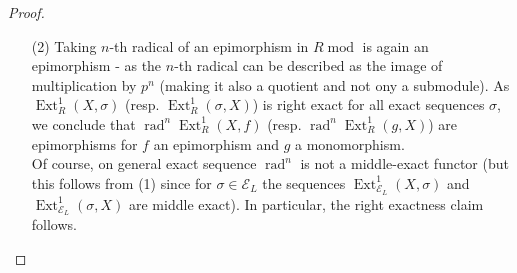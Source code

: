\documentclass[11pt,a4paper]{amsart}
\theoremstyle{plain}
\theoremstyle{definition}
\DeclareMathOperator{\Hom}{Hom}
\DeclareMathOperator{\Ext}{Ext}
\DeclareMathOperator{\modu}{mod}
\newcommand{\mcE}{\mathcal{E}}
\DeclareMathOperator{\rad}{rad}
\begin{document}
\begin{proof}
\begin{itemize}
\begin{itemize}
    $\sigma_{n} \mapsto \sigma_{n+1} \mapsto \cdots \mapsto \sigma_{m-1}$
\end{itemize} 
We claim $\Ext^1_{\mcE_{[0,n]}}=\rad^n\Ext^1_R$. First observe that in $\mcE_L$: $R/P^a$ $1\leq a \leq n$ are injectives and they are also projectives. So for $s= \min (\ell ,m) \leq n$ we have $\Ext^1_{\mcE_{[0,n]}}(R/P^m, R/P^{\ell})=0$ and for $m\leq n $ we have $\Ext^1_{\mcE_{[0,n]}}(R/P^m, R)=0$. \\
So we may always assume wlog that $n< \min (\ell,m)$, then proceed by induction over $n$. For $n=1$, a short exact sequence of in $R\modu$ is in $\mcE_{[0,1]}$ iff the indcomposable summands of number of the indec. summands of the outer terms add up to the indec summands of the middle term. This means in case (a) all exact sequence are in this exact structure except $\sigma_{0, m+n}$ and $\sigma_{m+n,0}$, in case (b) all except $\sigma_0$. \\
For $n>1$, it is enough to observe that $\Hom (-, R/P^n)$ is 
\begin{itemize}
\item[(ad a1)] exact on $\sigma_{n, m+\ell -n}$ and not exact on  $\sigma_{n-1, m+\ell -n+1}$
\item[(ad a2)] exact on $\sigma_{\ell+m-n, n}$ and not exact on  $\sigma_{\ell +m -n+1, n-1}$
\item[(ad b)] exact on $\sigma_{n}$ and not exact on  $\sigma_{n-1}$
\end{itemize}
Then the rest follows by induction hypothesis. \\
Now, for $\mcE'_L$ one observes that $\Ext^1_{\mcE'_L}(X,Y)=\Ext^1_{\mcE_L}(X,Y)$ for all $X,Y$ torsion, and for $Y$ free it is zero.\\
As $\Ext^1_{\mcE'}(X,Y)=\Ext^1_R(X,Y)$ for all $X,Y$ torsion and for $Y$ free it is zero. Then the claim $\Ext^1_{\mcE'_L}$ follows from the proof for $\Ext^1_{\mcE_L}$. 
\item[(2)] Taking $n$-th radical of an epimorphism in $R \modu$ is again an epimorphism - as the $n$-th radical can be described as the image of multiplication by $p^n$ (making it also a quotient and not ony a submodule). As $\Ext^1_R(X, \sigma)$ (resp. $\Ext^1_R(\sigma, X)$) is right exact for all exact sequences $\sigma$, we conclude that $\rad^n \Ext^1_R(X, f)$ (resp. $\rad^n \Ext^1_R(g, X)$) are epimorphisms for $f$ an epimorphism and $g$ a monomorphism. \\
Of  course, on general exact sequence $\rad^n$ is not a middle-exact functor (but this follows from (1) since for $\sigma \in \mcE_L$ the sequences $\Ext^1_{\mcE_L}(X,\sigma)$ and $\Ext^1_{\mcE_L}(\sigma ,X)$ are middle exact). In particular, the right exactness claim follows. \\

\end{itemize}
\end{proof}
\end{document}
